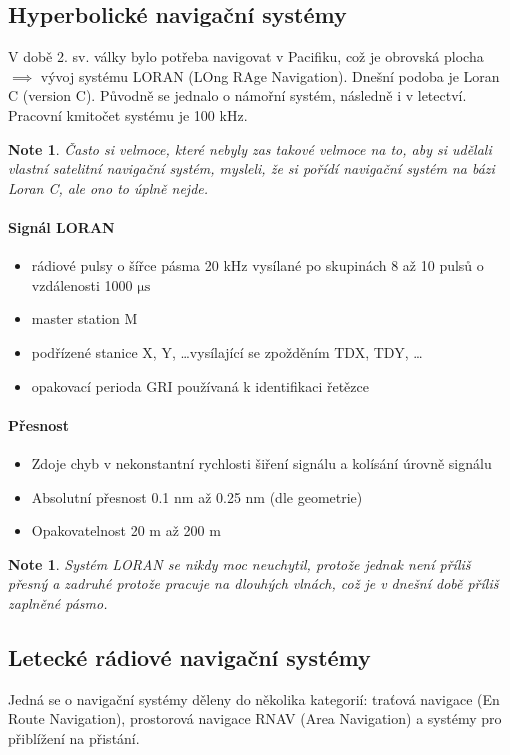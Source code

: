 \documentclass[11pt,a4paper]{article}
\theoremstyle{my-theorem}
\theoremstyle{non-theorem}
\newtheorem{note}[theorem]{Note}
\begin{document}
\subsection*{Hyperbolické navigační systémy}
V době 2. sv. války bylo potřeba navigovat v Pacifiku, což je obrovská plocha $\implies$ vývoj systému LORAN (LOng RAge Navigation). Dnešní podoba je Loran C (version C). Původně se jednalo o námořní systém, následně i v letectví. Pracovní kmitočet systému je 100 kHz.
\begin{note}
    Často si velmoce, které nebyly zas takové velmoce na to, aby si udělali vlastní satelitní navigační systém, mysleli, že si pořídí navigační systém na bázi Loran C, ale ono to úplně nejde.
\end{note}

\paragraph*{Signál LORAN}
\begin{itemize}
    \item rádiové pulsy o šířce pásma 20 kHz vysílané po skupinách 8 až 10 pulsů o vzdálenosti 1000 $\mathrm{\mu s}$
    \item master station M
    \item podřízené stanice X, Y, \dots vysílající se zpožděním TDX, TDY, \dots
    \item opakovací perioda GRI používaná k identifikaci řetězce
\end{itemize}

\paragraph*{Přesnost}
\begin{itemize}
    \item Zdoje chyb v nekonstantní rychlosti šiření signálu a kolísání úrovně signálu
    \item Absolutní přesnost 0.1 nm až 0.25 nm (dle geometrie)
    \item Opakovatelnost 20 m až 200 m
\end{itemize}

\begin{note}
    Systém LORAN se nikdy moc neuchytil, protože jednak není příliš přesný a zadruhé protože pracuje na dlouhých vlnách, což je v dnešní době příliš zaplněné pásmo.
\end{note}

\subsection*{Letecké rádiové navigační systémy}
Jedná se o navigační systémy děleny do několika kategorií: traťová navigace (En Route Navigation), prostorová navigace RNAV (Area Navigation) a systémy pro přiblížení na přistání.
\end{document}
